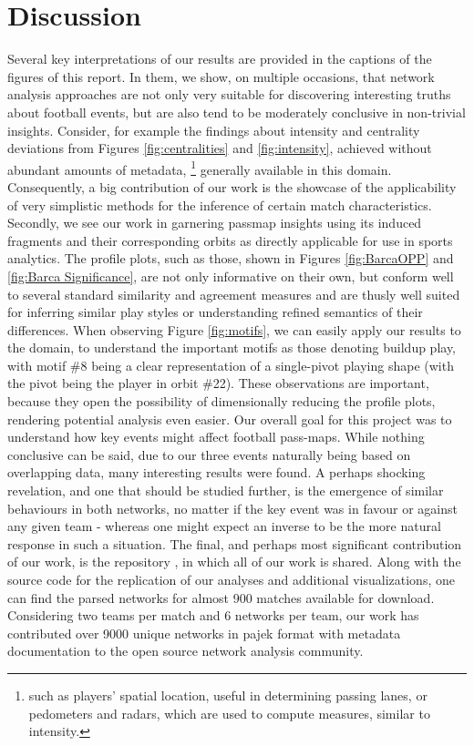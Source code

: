 \documentclass[9pt,twocolumn,twoside]{pnas-report}
\begin{document}
\section*{Discussion}
Several key interpretations of our results are provided in the captions of the figures of this report. In them, we show, on multiple occasions, that network analysis approaches are not only very suitable for discovering interesting truths about football events, but are also tend to be moderately conclusive in non-trivial insights. Consider, for example the findings about intensity and centrality deviations from Figures \ref{fig:centralities} and \ref{fig:intensity}, achieved without abundant amounts of metadata, \footnote{such as players' spatial location, useful in determining passing lanes, or pedometers and radars, which are used to compute measures, similar to intensity.} generally available in this domain. Consequently, a big contribution of our work is the showcase of the applicability of very simplistic methods for the inference of certain match characteristics.
Secondly, we see our work in garnering passmap insights using its induced fragments and their corresponding orbits as directly applicable for use in sports analytics. The profile plots, such as those, shown in Figures \ref{fig:BarcaOPP} and \ref{fig:Barca Significance}, are not only informative on their own, but conform well to several standard similarity and agreement measures and are thusly well suited for inferring similar play styles or understanding refined semantics of their differences. When observing Figure \ref{fig:motifs}, we can easily apply our results to the domain, to understand the important motifs as those denoting buildup play, with motif \#8 being a clear representation of a single-pivot playing shape (with the pivot being the player in orbit \#22). These observations are important, because they open the possibility of dimensionally reducing the profile plots, rendering potential analysis even easier.
Our overall goal for this project was to understand how key events might affect football pass-maps. While nothing conclusive can be said, due to our three events naturally being based on overlapping data, many interesting results were found. A perhaps shocking revelation, and one that should be studied further, is the emergence of similar behaviours in both networks, no matter if the key event was in favour or against any given team - whereas one might expect an inverse to be the more natural response in such a situation. 
The final, and perhaps most significant contribution of our work, is the repository \cite{marusagit}, in which all of our work is shared. Along with the source code for the replication of our analyses and additional visualizations, one can find the parsed networks for almost 900 matches available for download. Considering two teams per match and 6 networks per team, our work has contributed over 9000 unique networks in pajek format with metadata documentation to the open source network analysis community.
\end{document}
